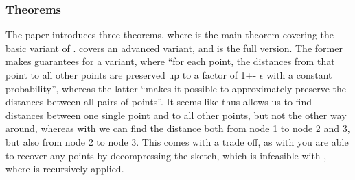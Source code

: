 \subsubsection{Theorems}
The paper introduces three theorems, where  is the main theorem covering the basic variant of \qs{}.  covers an advanced variant, and  is the full version. The former makes guarantees for a \qs{} variant, where “for each point, the distances from that point to all other points are preserved up to a factor of 1+- $\epsilon$ with a constant probability”, whereas the latter “makes it possible to approximately preserve the distances between all pairs of points”. It seems like  thus allows us to find distances between one single point and to all other points, but not the other way around, whereas with  we can find the distance both from node 1 to node 2 and 3, but also from node 2 to node 3. This comes with a trade off, as with  you are able to recover any points by decompressing the sketch, which is infeasible with , where \qs{} is recursively applied.

